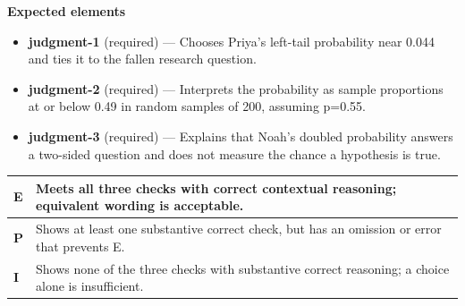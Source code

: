 \documentclass[11pt]{article}
\begin{document}

\textbf{Expected elements}
\begin{itemize}[leftmargin=1.5em,itemsep=2pt,topsep=2pt]
  \item \textbf{judgment-1} (required) --- Chooses Priya's left-tail probability near 0.044 and ties it to the fallen research question.
  \item \textbf{judgment-2} (required) --- Interprets the probability as sample proportions at or below 0.49 in random samples of 200, assuming p=0.55.
  \item \textbf{judgment-3} (required) --- Explains that Noah's doubled probability answers a two-sided question and does not measure the chance a hypothesis is true.
\end{itemize}

{\small\renewcommand{\arraystretch}{1.25}
\noindent\begin{tabular}{|p{0.5in}|p{5.9in}|}
\hline
\textbf{E} & Meets all three checks with correct contextual reasoning; equivalent wording is acceptable. \\ \hline
\textbf{P} & Shows at least one substantive correct check, but has an omission or error that prevents E. \\ \hline
\textbf{I} & Shows none of the three checks with substantive correct reasoning; a choice alone is insufficient. \\ \hline
\end{tabular}}

\clearpage
{}
\end{document}
